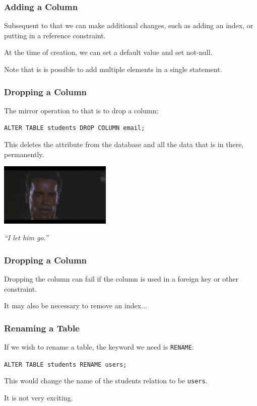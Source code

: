 \begin{frame}
\frametitle{Adding a Column}


Subsequent to that we can make additional changes, such as adding an index, or putting in a reference constraint.

At the time of creation, we can set a default value and set not-null.

Note that is is possible to add multiple elements in a single statement. 

\end{frame}

\begin{frame}
\frametitle{Dropping a Column}

The mirror operation to that is to drop a column: 

\texttt{ALTER TABLE students DROP COLUMN email;} 

This deletes the attribute from the database and all the data that is in there, \alert{permanently}. 

\begin{center}
	\includegraphics[width=0.4\textwidth]{images/let-him-go.jpg}
\end{center}
\hfill \textit{``I let him go.''}

\end{frame}

\begin{frame}
\frametitle{Dropping a Column}


Dropping the column can fail if the column is used in a foreign key or other constraint. 

It may also be necessary to remove an index... 

\end{frame}

\begin{frame}
\frametitle{Renaming a Table}

If we wish to rename a table, the keyword we need is \texttt{RENAME}: 

\texttt{ALTER TABLE students RENAME users;} 

This would change the name of the students relation to be \texttt{users}. 

It is not very exciting.

\end{frame}

